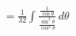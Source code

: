\documentclass[preview]{standalone}
\begin{document}
\begin{align*}
&=\frac{1}{32} \int \frac{\frac{1}{\cos\theta}}{\frac{\sin^2\theta}{\cos^2\theta}} \, d\theta
\end{align*}
\end{document}

